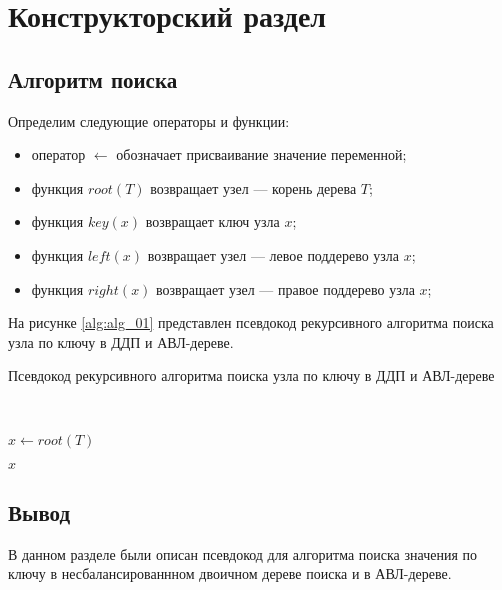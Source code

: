 \chapter{Конструкторский раздел}

\section{Алгоритм поиска}

Определим следующие операторы и функции:

\begin{itemize}[label*=--]
	\item оператор $\gets$ обозначает присваивание значение переменной;
	\item функция $root(T)$ возвращает узел --- корень дерева $T$;
	\item функция $key(x)$ возвращает ключ узла $x$;
	\item функция $left(x)$ возвращает узел --- левое поддерево узла $x$;
	\item функция $right(x)$ возвращает узел --- правое поддерево узла $x$;
\end{itemize}

На рисунке \ref{alg:alg_01} представлен псевдокод рекурсивного алгоритма поиска узла по ключу в ДДП и АВЛ-дереве.

\begin{algorithm}[H]
	\caption{Псевдокод рекурсивного алгоритма поиска узла по ключу в ДДП и АВЛ-дереве}
	\label{alg:alg_01}
	\\
	\begin{algorithmic}[1]
		\State $x \gets root(T)$
		
		\State \Return $x$
		\EndIf
		
		\State \Return {}
		\Else
		\State \Return {}
		\EndIf
		
		\EndFunction
	\end{algorithmic}
\end{algorithm}

%
%		
%		
%		


\section*{Вывод}

В данном разделе были описан псевдокод для алгоритма поиска значения по ключу в несбалансированнном двоичном дереве поиска и в АВЛ-дереве.



